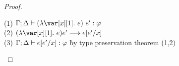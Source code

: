 \BetaReductionTheorem

\begin{proof}~

\begin{tabbing}
    (1) $\G; \D \vdash (\lambda \xl.~e)~e' : \vp$\\
    (2) $(\lambda \xl.~e) e' \longrightarrow e[e'/x]$\\
    (3) $\Gamma; \Delta \vdash e[e'/x] : \varphi$ \` by type preservation theorem (1,2)\\

\end{tabbing}
\end{proof}

\BetaReductionSharingTheorem

